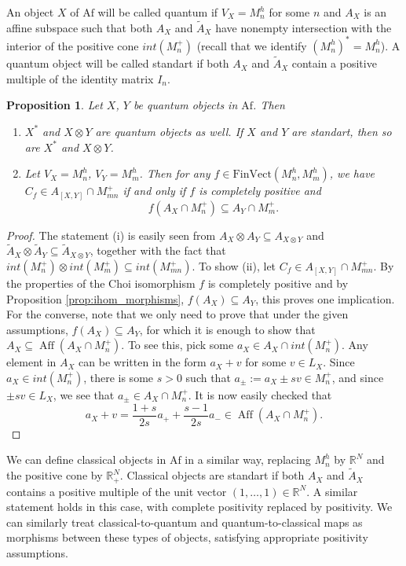 \documentclass[12pt]{article}
\newtheorem{prop}{Proposition}
\theoremstyle{definition}
\theoremstyle{remark}
\def\aff{\operatorname{Aff}}
\def \Af{\mathrm{Af}}
\def \FV{\mathrm{FinVect}}
\begin{document}
An object $X$ of $\Af$ will be called quantum if $V_X=M_n^h$ for some $n$ and $A_X$ is an
affine subspace such that both $A_X$ and $\tilde A_X$ have nonempty intersection with the
interior of the positive cone 
$int(M_n^+)$ (recall that we identify $(M_n^h)^*=M_n^h$). A quantum object will be called
standart if both $A_X$ and $\tilde A_X$ contain a positive multiple of the identity matrix
$I_n$. 




\begin{prop}\label{prop:ihom_quantum} Let $X$, $Y$ be quantum objects in $\Af$. Then 
\begin{enumerate}
\item[(i)] $X^*$ and $X\otimes Y$ are quantum objects as well. If $X$ and $Y$ are
standart, then so are $X^*$ and $X\otimes Y$.
\item[(ii)] Let $V_X=M_n^h$, $V_Y=M_m^h$. Then for any $f\in \FV(M_n^h,M_m^h)$, we have
$C_f\in A_{[X,Y]}\cap M_{mn}^+$ if and only if $f$ is completely positive and
\[
f(A_X\cap M_n^+)\subseteq A_Y\cap M_m^+.
\]
\end{enumerate}


\end{prop}

\begin{proof} The statement (i) is easily seen from  $A_X\otimes A_Y
\subseteq  A_{X\otimes Y}$ and $\tilde A_X\otimes \tilde A_Y\subseteq \tilde A_{X\otimes
Y}$, together with the fact that $int(M_n^+)\otimes int(M_m^+)\subseteq int(M_{mn}^+)$. 
To show (ii), let $C_f\in   A_{[X,Y]}\cap M_{mn}^+$. By the properties of the Choi
isomorphism $f$ is completely positive and by Proposition \ref{prop:ihom_morphisms},
$f(A_X)\subseteq A_Y$, this proves one implication. For the converse, note that we only
need to prove that under the given assumptions, $f(A_X)\subseteq A_Y$, for which it is enough
to show that $A_X\subseteq \aff(A_X\cap M_n^+)$. To see this, pick some  $a_X\in  A_X\cap
int(M_n^+)$. Any element in $A_X$ can be written in the form $a_X+v$ for some $v\in L_X$.
Since $a_X\in int(M_n^+)$, there is some $s>0$ such that $a_\pm:=a_X\pm sv\in M_n^+$, and
since $\pm sv\in L_X$, we see that $a_\pm \in A_X\cap M_n^+$. It is now easily checked
that
\[
a_X+v=\frac{1+s}{2s}a_++\frac{s-1}{2s}a_-\in \aff(A_X\cap M_n^+). 
\]


\end{proof}

We can define classical objects in $\Af$ in a similar way, replacing $M_n^h$ by $\mathbb
R^N$ and the positive cone by $\mathbb R_+^N$. Classical objects are standart if both
$A_X$ and $\tilde A_X$ contains a positive multiple of the unit vector $(1,\dots,1)\in
\mathbb R^N$. A similar statement holds in this case,
with complete positivity replaced by positivity. We can similarly treat
classical-to-quantum and quantum-to-classical maps as morphisms between these types of
objects, satisfying appropriate positivity assumptions.
\end{document}
